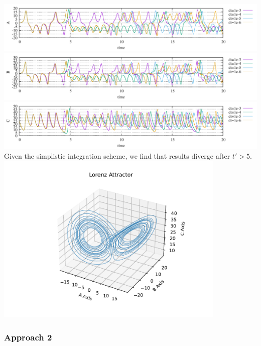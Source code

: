 \begin{center}
\includegraphics[width=16cm]{python_codes/fieldstone_156/wiki/A.pdf}\\
\includegraphics[width=16cm]{python_codes/fieldstone_156/wiki/B.pdf}\\
\includegraphics[width=16cm]{python_codes/fieldstone_156/wiki/C.pdf}\\
{\captionfont Given the simplistic integration scheme, we find that 
results diverge after $t'>5$.}\\
\includegraphics[width=11cm]{python_codes/fieldstone_156/wiki/ABC.pdf}
\end{center}

\subsubsection*{Approach 2}

